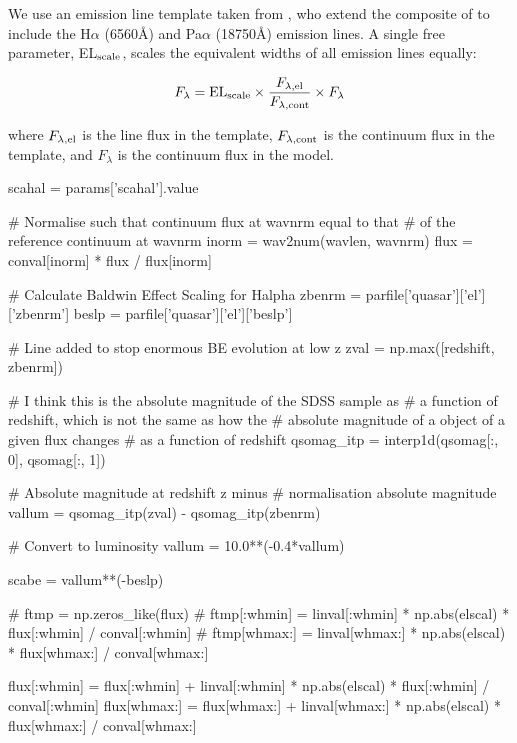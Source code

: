 We use an emission line template taken from \citet{maddox06}, who extend the composite of \citet{francis91} to include the H$\alpha$ (6560\AA) and Pa$\alpha$ (18750\AA) emission lines. 
A single free parameter, EL$_{\rm scale}$, scales the equivalent widths of all emission lines equally:

\begin{eqnarray}
  F_{\lambda} =  {\rm EL}_{\rm scale} \times \frac{F_{\lambda, \rm el}}{F_{\lambda, \rm cont}} \times F_{\lambda} 
\end{eqnarray} 

where $F_{\lambda, \rm el}$ is the line flux in the template, $F_{\lambda,\rm cont}$ is the continuum flux in the template, and $F_{\lambda}$ is the continuum flux in the model.  


scahal = params['scahal'].value

    # Normalise such that continuum flux at wavnrm equal to that
    # of the reference continuum at wavnrm
    inorm = wav2num(wavlen, wavnrm)
    flux = conval[inorm] * flux / flux[inorm]

    # Calculate Baldwin Effect Scaling for Halpha
    zbenrm = parfile['quasar']['el']['zbenrm']
    beslp = parfile['quasar']['el']['beslp']

    # Line added to stop enormous BE evolution at low z 
    zval = np.max([redshift, zbenrm]) 

    # I think this is the absolute magnitude of the SDSS sample as 
    # a function of redshift, which is not the same as how the 
    # absolute magnitude of a object of a given flux changes 
    # as a function of redshift 
    qsomag_itp = interp1d(qsomag[:, 0], qsomag[:, 1])

    # Absolute magnitude at redshift z minus
    # normalisation absolute magnitude
    vallum = qsomag_itp(zval) - qsomag_itp(zbenrm) 

    # Convert to luminosity 
    vallum = 10.0**(-0.4*vallum)

    scabe = vallum**(-beslp) 
     
    # ftmp = np.zeros_like(flux)
    # ftmp[:whmin] = linval[:whmin] * np.abs(elscal) * flux[:whmin] / conval[:whmin]
    # ftmp[whmax:] = linval[whmax:] * np.abs(elscal) * flux[whmax:] / conval[whmax:]

     
    flux[:whmin] = flux[:whmin] + linval[:whmin] * np.abs(elscal) * flux[:whmin] / conval[:whmin]
    flux[whmax:] = flux[whmax:] + linval[whmax:] * np.abs(elscal) * flux[whmax:] / conval[whmax:]

